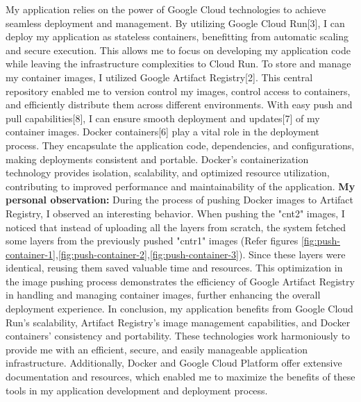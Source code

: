 My application relies on the power of Google Cloud technologies to achieve seamless deployment and management. By utilizing Google Cloud Run[3], I can deploy my application as stateless containers, benefitting from automatic scaling and secure execution. This allows me to focus on developing my application code while leaving the infrastructure complexities to Cloud Run.
\newline\newline
To store and manage my container images, I utilized Google Artifact Registry[2]. This central repository enabled me to version control my images, control access to containers, and efficiently distribute them across different environments. With easy push and pull capabilities[8], I can ensure smooth deployment and updates[7] of my container images.
\newline\newline
Docker containers[6] play a vital role in the deployment process. They encapsulate the application code, dependencies, and configurations, making deployments consistent and portable. Docker's containerization technology provides isolation, scalability, and optimized resource utilization, contributing to improved performance and maintainability of the application.
\newline\newline
 \textbf{My personal observation:}
 \newline
During the process of pushing Docker images to Artifact Registry, I observed an interesting behavior. When pushing the "cnt2" images, I noticed that instead of uploading all the layers from scratch, the system fetched some layers from the previously pushed "cntr1" images (Refer figures \ref{fig:push-container-1},\ref{fig:push-container-2},\ref{fig:push-container-3}). Since these layers were identical, reusing them saved valuable time and resources. This optimization in the image pushing process demonstrates the efficiency of Google Artifact Registry in handling and managing container images, further enhancing the overall deployment experience.
\newline\newline
In conclusion, my application benefits from Google Cloud Run's scalability, Artifact Registry's image management capabilities, and Docker containers' consistency and portability. These technologies work harmoniously to provide me with an efficient, secure, and easily manageable application infrastructure. Additionally, Docker and Google Cloud Platform offer extensive documentation and resources, which enabled me to maximize the benefits of these tools in my application development and deployment process.











\newpage